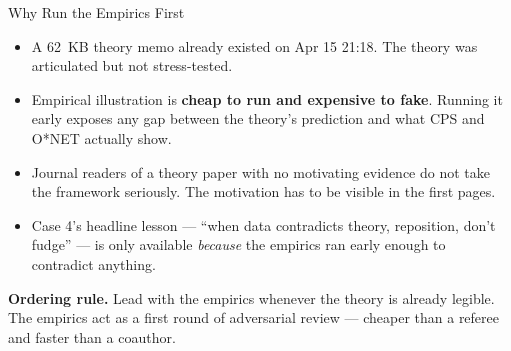\documentclass[10pt,english,aspectratio=169]{beamer}
\begin{document}
\begin{frame}{Why Run the Empirics First}
\begin{itemize}\small
  \item A 62~KB theory memo already existed on Apr 15 21:18. The theory was articulated but not stress-tested.
  \item Empirical illustration is \textbf{cheap to run and expensive to fake}. Running it early exposes any gap between the theory's prediction and what CPS and O*NET actually show.
  \item Journal readers of a theory paper with no motivating evidence do not take the framework seriously. The motivation has to be visible in the first pages.
  \item Case 4's headline lesson --- ``when data contradicts theory, reposition, don't fudge'' --- is only available \emph{because} the empirics ran early enough to contradict anything.
\end{itemize}

\vspace{0.3cm}
\begin{tcolorbox}[colback=blue!3,colframe=RedTitle!60]
\textbf{Ordering rule.} Lead with the empirics whenever the theory is already legible. The empirics act as a first round of adversarial review --- cheaper than a referee and faster than a coauthor.
\end{tcolorbox}
\end{frame}
\end{document}
